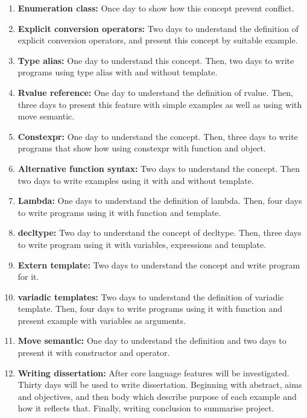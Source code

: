 \documentclass[11pt]{report}
\begin{document}
\begin{enumerate}
\item \textbf{Enumeration class:} Once day to show how this concept prevent conflict.

\item \textbf{Explicit conversion operators:} Two days to understand the \linebreak definition of explicit conversion operators, and present this concept by suitable example.

\item \textbf{Type alias: } One day to understand this concept. Then, two days to write programs using type alias with and without template.

\item \textbf{Rvalue reference:} One day to understand the definition of rvalue. Then, three days to present this feature with simple examples as well as using with move semantic.

\item \textbf{Constexpr:} One day to understand the concept. Then, three days to write programs that show how using constexpr with function and object.

\item \textbf{Alternative function syntax:} Two days to understand the concept. Then two days to write examples using it with and without template.

\item \textbf{Lambda:} One days to understand the definition of lambda. Then, four days to write programs using it with function and template.

\item \textbf{decltype:} Two day to understand the concept of decltype. Then, three days to write program using it with variables, expressions and template.

\item \textbf{Extern template:} Two days to understand the concept and write \linebreak program for it.

\item \textbf{variadic templates: } Two days to understand the definition of variadic template. Then, four days to write programs using it with function and present example with variables as arguments.

\item \textbf{Move semantic:} One day to understand the definition and two days to present it with constructor and operator.

\item \textbf{Writing dissertation:} After core language features will be \linebreak investigated. Thirty  days  will be used to write dissertation. Beginning with abstract, aims and objectives, and then body which describe purpose of each example and how it reflects that. Finally, writing conclusion to summarise project.


\end{enumerate}
\end{document}
